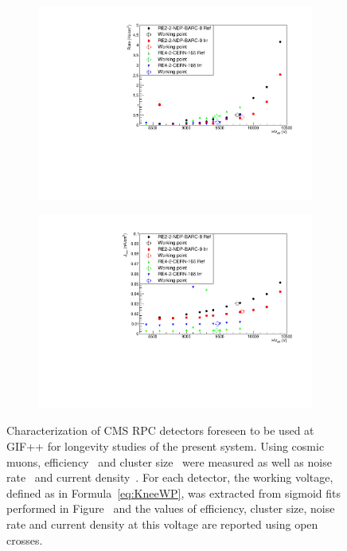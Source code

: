 \begin{figure}[H]
\begin{subfigure}{0.5\linewidth}
    		\includegraphics[width = 0.7\plotwidth]{fig/chapt5/Consolidation-Noise-Rate.pdf}
        	\caption{\label{fig:consolidation:C}}
    	\end{subfigure}
    	\begin{subfigure}{0.5\linewidth}
			\centering
    		\includegraphics[width = 0.7\plotwidth]{fig/chapt5/Consolidation-Current-Density.pdf}
        	\caption{\label{fig:consolidation:D}}
    	\end{subfigure}
		\caption{\label{fig:consolidation} Characterization of CMS RPC detectors foreseen to be used at GIF++ for longevity studies of the present system. Using cosmic muons, efficiency~ and cluster size~ were measured as well as noise rate~ and current density~. For each detector, the working voltage, defined as in Formula~\ref{eq:KneeWP}, was extracted from sigmoid fits performed in Figure~ and the values of efficiency, cluster size, noise rate and current density at this voltage are reported using open crosses.}
	\end{figure}
	
